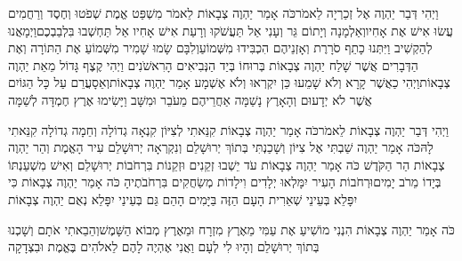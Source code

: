 \documentclass[../main/main.tex]{subfiles}
\begin{document}
\begin{multicols}{\ncols}
וַיְהִי דְּבַר יַהְוֶה אֶל זְכַרְיָה לֵאמֹר\PreVerseSpace{}כֹּה אָמַר יַהְוֶה צְבָאוֹת לֵאמֹר מִשְׁפַּט אֱמֶת שְׁפֹטוּ וְחֶסֶד וְרַחֲמִים עֲשׂוּ אִישׁ אֶת אָחִיו\PreVerseSpace{}וְאַלְמָנָה וְיָתוֹם גֵּר וְעָנִי אַל תַּעֲשֹׁקוּ וְרָעַת אִישׁ אָחִיו אַל תַּחְשְׁבוּ בִּלְבַבְכֶם\PreVerseSpace{}וַיְמָאֲנוּ לְהַקְשִׁיב וַיִּתְּנוּ כָתֵף סֹרָרֶת וְאָזְנֵיהֶם הִכְבִּידוּ מִשְּׁמוֹעַ\PreVerseSpace{}וְלִבָּם שָׂמוּ שָׁמִיר מִשְּׁמוֹעַ אֶת הַתּוֹרָה וְאֶת הַדְּבָרִים אֲשֶׁר שָׁלַח יַהְוֶה צְבָאוֹת בְּרוּחוֹ בְּיַד הַנְּבִיאִים הָרִאשֹׁנִים וַיְהִי קֶצֶף גָּדוֹל מֵאֵת יַהְוֶה צְבָאוֹת\PreVerseSpace{}וַיְהִי כַאֲשֶׁר קָרָא וְלֹא שָׁמֵעוּ כֵּן יִקְרְאוּ וְלֹא אֶשְׁמָע אָמַר יַהְוֶה צְבָאוֹת\PreVerseSpace{}וְאֵסָעֲרֵם עַל כָּל הַגּוֹיִם אֲשֶׁר לֹא יְדָעוּם וְהָאָרֶץ נָשַׁמָּה אַחֲרֵיהֶם מֵעֹבֵר וּמִשָּׁב וַיָּשִׂימוּ אֶרֶץ חֶמְדָּה לְשַׁמָּה\OpenSection{}\par
\pagebreak %
וַיְהִי דְּבַר יַהְוֶה צְבָאוֹת לֵאמֹר\PreVerseSpace{}כֹּה אָמַר יַהְוֶה צְבָאוֹת קִנֵּאתִי לְצִיּוֹן קִנְאָה גְדוֹלָה וְחֵמָה גְדוֹלָה קִנֵּאתִי לָהּ\PreVerseSpace{}כֹּה אָמַר יַהְוֶה שַׁבְתִּי אֶל צִיּוֹן וְשָׁכַנְתִּי בְּתוֹךְ יְרוּשָׁלֵם וְנִקְרְאָה יְרוּשָׁלֵם עִיר הָאֱמֶת וְהַר יַהְוֶה צְבָאוֹת הַר הַקֹּדֶשׁ \ClosedSection{}כֹּה אָמַר יַהְוֶה צְבָאוֹת עֹד יֵשְׁבוּ זְקֵנִים וּזְקֵנוֹת בִּרְחֹבוֹת יְרוּשָׁלֵם וְאִישׁ מִשְׁעַנְתּוֹ בְּיָדוֹ מֵרֹב יָמִים\PreVerseSpace{}וּרְחֹבוֹת הָעִיר יִמָּלְאוּ יְלָדִים וִילָדוֹת מְשַׂחֲקִים בִּרְחֹבֹתֶיהָ \ClosedSection{}כֹּה אָמַר יַהְוֶה צְבָאוֹת כִּי יִפָּלֵא בְּעֵינֵי שְׁאֵרִית הָעָם הַזֶּה בַּיָּמִים הָהֵם גַּם בְּעֵינַי יִפָּלֵא נְאֻם יַהְוֶה צְבָאוֹת\OpenSection{}\par
{}כֹּה אָמַר יַהְוֶה צְבָאוֹת הִנְנִי מוֹשִׁיעַ אֶת עַמִּי מֵאֶרֶץ מִזְרָח וּמֵאֶרֶץ מְבוֹא הַשָּׁמֶשׁ\PreVerseSpace{}וְהֵבֵאתִי אֹתָם וְשָׁכְנוּ בְּתוֹךְ יְרוּשָׁלֵם וְהָיוּ לִי לְעָם וַאֲנִי אֶהְיֶה לָהֶם לֵאלֹהִים בֶּאֱמֶת וּבִצְדָקָה\OpenSection{}\par

\end{multicols}
\end{document}
